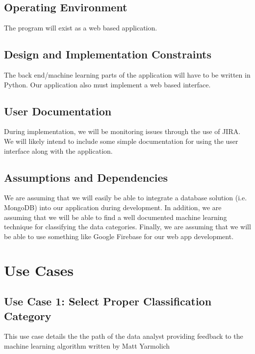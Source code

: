 \documentclass[12pt,oneside,letterpaper]{article}
\begin{document}
\subsection{Operating Environment}
The program will exist as a web based application.
\subsection{Design and Implementation Constraints}
The \gls{back end}/machine learning parts of the application will have to be written in Python. Our application also must implement a web based interface.
\subsection{User Documentation}
During implementation, we will be monitoring issues through the use of JIRA. We will likely intend to include some simple documentation for using the user interface along with the application. 
\subsection{Assumptions and Dependencies}
We are assuming that we will easily be able to integrate a database solution (i.e. MongoDB) into our application during development. In addition, we are assuming that we will be able to find a well documented machine learning technique for classifying the data categories. Finally, we are assuming that we will be able to use something like Google Firebase for our web app development.


\section{Use Cases}

\subsection{\label{Selecting the Proper Classification from the UIl}Use Case 1: Select Proper Classification Category}
This use case details the the path of the data analyst providing feedback to the machine learning algorithm written by Matt Yarmolich
\end{document}
